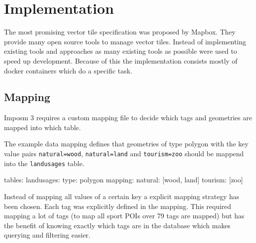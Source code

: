 \chapter{Implementation}\label{implementation}

The most promising vector tile specification was proposed by Mapbox.
They provide many open source tools to manage vector tiles. Instead of implementing existing tools and approaches as many existing tools
as possible were used to speed up development.
Because of this the implementation consists mostly of docker containers which do a specific task.

\section{Mapping}

Imposm 3 requires a custom mapping file to decide which tags and geometries are mapped into which table.

The example data mapping\cite{81_imposm.org_2015} defines that geometries of type polygon with the key value pairs \texttt{natural=wood}, \texttt{natural=land} and \texttt{tourism=zoo} should be mappend into the \texttt{landusages} table.

\begin{yamlcode}
tables:
   landusages:
     type: polygon
     mapping:
       natural: [wood, land]
       tourism: [zoo]
\end{yamlcode}

Instead of mapping all values of a certain key a explicit mapping strategy has been chosen. Each tag was explicitly defined in the mapping. This required mapping a lot of tags (to map all sport POIs over 79 tags are mapped) but has the benefit of knowing exactly which tags are in the database which makes querying and filtering easier.

